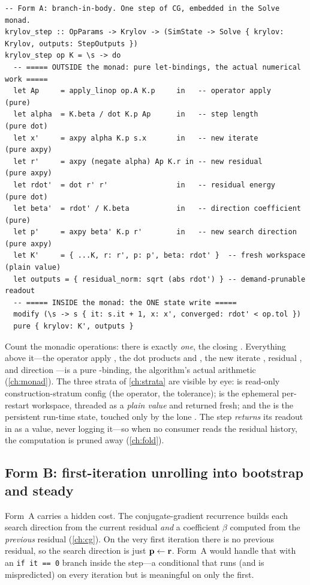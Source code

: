 \begin{lstlisting}[style=l4style]
-- Form A: branch-in-body. One step of CG, embedded in the Solve monad.
krylov_step :: OpParams -> Krylov -> (SimState -> Solve { krylov: Krylov, outputs: StepOutputs })
krylov_step op K = \s -> do
  -- ===== OUTSIDE the monad: pure let-bindings, the actual numerical work =====
  let Ap     = apply_linop op.A K.p     in   -- operator apply        (pure)
  let alpha  = K.beta / dot K.p Ap      in   -- step length           (pure dot)
  let x'     = axpy alpha K.p s.x       in   -- new iterate           (pure axpy)
  let r'     = axpy (negate alpha) Ap K.r in -- new residual          (pure axpy)
  let rdot'  = dot r' r'                in   -- residual energy       (pure dot)
  let beta'  = rdot' / K.beta           in   -- direction coefficient (pure)
  let p'     = axpy beta' K.p r'        in   -- new search direction   (pure axpy)
  let K'     = { ...K, r: r', p: p', beta: rdot' }  -- fresh workspace (plain value)
  let outputs = { residual_norm: sqrt (abs rdot') } -- demand-prunable readout
  -- ===== INSIDE the monad: the ONE state write =====
  modify (\s -> s { it: s.it + 1, x: x', converged: rdot' < op.tol })
  pure { krylov: K', outputs }
\end{lstlisting}

\noindent Count the monadic operations: there is exactly \emph{one}, the closing
. Everything above it---the operator apply , the dot products
 and , the new iterate , residual , and
direction ---is a pure -binding, the algorithm's actual arithmetic
(\cref{ch:monad}). The three strata of \cref{ch:strata} are visible by eye:
 is read-only construction-stratum config (the operator, the tolerance);
 is the ephemeral per-restart workspace, threaded as a \emph{plain value} and
returned fresh; and the   is the persistent run-time state,
touched only by the lone . The step \emph{returns} its readout in
 as a value, never logging it---so when no consumer reads the residual
history, the  computation is pruned away (\cref{ch:fold}).

\subsection{Form B: first-iteration unrolling into bootstrap and steady}

Form~A carries a hidden cost. The conjugate-gradient recurrence builds each search
direction from the current residual \emph{and} a coefficient $\beta$ computed from
the \emph{previous} residual (\cref{ch:cg}). On the very first iteration there is no
previous residual, so the search direction is just $\mathbf{p}\gets\mathbf{r}$. Form~A would
handle that with an \lstinline[style=l4style]|if it == 0| branch inside the step---a
conditional that runs (and is mispredicted) on every iteration but is meaningful on
only the first.

